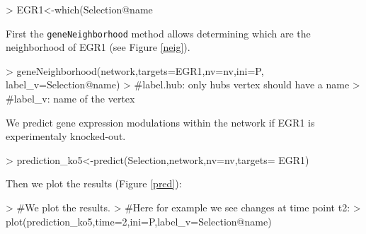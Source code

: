 \documentclass[a4paper]{article}
\begin{document}
\begin{Schunk}
\begin{Sinput}
> EGR1<-which(Selection@name %
\end{Sinput}
\end{Schunk}

First the \texttt{geneNeighborhood} method allows determining which are the neighborhood of EGR1 (see Figure \ref{neig}). \\

\begin{Schunk}
\begin{Sinput}
> geneNeighborhood(network,targets=EGR1,nv=nv,ini=P,
   label_v=Selection@name)
> #label.hub: only hubs vertex should have a name
> #label_v: name of the vertex
\end{Sinput}
\end{Schunk}


We  predict gene expression modulations within the network if EGR1 is experimentaly knocked-out. 

\begin{Schunk}
\begin{Sinput}
> prediction_ko5<-predict(Selection,network,nv=nv,targets= EGR1)
\end{Sinput}
\end{Schunk}

Then we plot the results (Figure \ref{pred}): 
\begin{Schunk}
\begin{Sinput}
> #We plot the results.
> #Here for example we see changes at time point t2:
> plot(prediction_ko5,time=2,ini=P,label_v=Selection@name)
\end{Sinput}
\end{Schunk}
\end{document}
